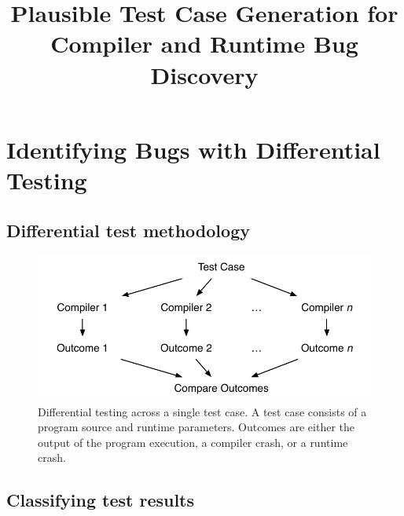 



\title{Plausible Test Case Generation for Compiler and Runtime Bug Discovery}

%
%

\maketitle






\section{Identifying Bugs with Differential Testing}

\subsection{Differential test methodology}

\begin{figure}
  \centering
  \includegraphics[width=.9\columnwidth]{img/difftest} %
  \caption{%
    Differential testing across a single test case. A test case consists of a program source and runtime parameters. Outcomes are either the output of the program execution, a compiler crash, or a runtime crash.%
  }%
  \label{fig:difftest}
\end{figure}


\subsection{Classifying test results}

